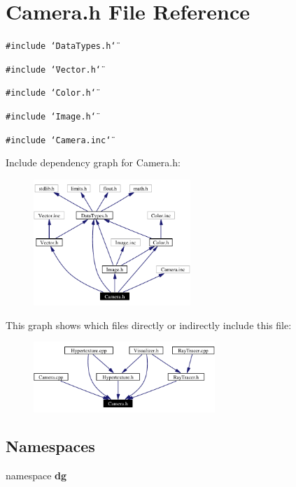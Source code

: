 \section{Camera.h File Reference}
\label{Camera_8h}
{\tt \#include \char`\"{}Data\-Types.h\char`\"{}}\par
{\tt \#include \char`\"{}Vector.h\char`\"{}}\par
{\tt \#include \char`\"{}Color.h\char`\"{}}\par
{\tt \#include \char`\"{}Image.h\char`\"{}}\par
{\tt \#include \char`\"{}Camera.inc\char`\"{}}\par


Include dependency graph for Camera.h:\begin{figure}[H]
\begin{center}
\leavevmode
\includegraphics[width=168pt]{Camera_8h__incl}
\end{center}
\end{figure}


This graph shows which files directly or indirectly include this file:\begin{figure}[H]
\begin{center}
\leavevmode
\includegraphics[width=194pt]{Camera_8h__dep__incl}
\end{center}
\end{figure}
\subsection*{Namespaces}
\begin{CompactItemize}
\item 
namespace {\bf dg}
\end{CompactItemize}
